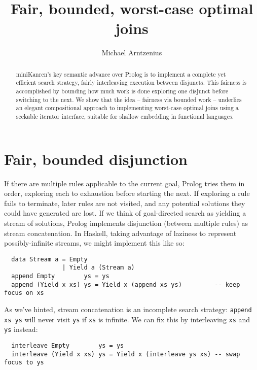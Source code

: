 \documentclass[acmsmall,screen,review,anonymous,dvipsnames]{acmart}
\title{Fair, bounded, worst-case optimal joins}
\author{Michael Arntzenius}
\affiliation{%
	\institution{UC Berkeley}
	\city{Berkeley}
	\state{CA}
	\country{USA}
}
\begin{document}
\begin{abstract}
  {miniKanren}'s key semantic advance over Prolog is to implement a complete yet efficient search strategy, fairly interleaving execution between disjuncts.
  This fairness is accomplished by bounding how much work is done exploring one disjunct before switching to the next.
  We show that the idea -- fairness via bounded work -- underlies an elegant compositional approach to implementing worst-case optimal joins using a seekable iterator interface, suitable for shallow embedding in functional languages.
\end{abstract}

\maketitle

\section{Fair, bounded disjunction}

If there are multiple rules applicable to the current goal, Prolog tries them in order, exploring each to exhaustion before starting the next.
If exploring a rule fails to terminate, later rules are not visited, and any potential solutions they could have generated are lost.
If we think of goal-directed search as yielding a stream of solutions, Prolog implements disjunction (between multiple rules) as stream concatenation.
In Haskell, taking advantage of laziness to represent possibly-infinite streams, we might implement this like so:

\begin{verbatim}
  data Stream a = Empty
                | Yield a (Stream a)
  append Empty        ys = ys
  append (Yield x xs) ys = Yield x (append xs ys)         -- keep focus on xs
\end{verbatim}

\noindent
As we've hinted, stream concatenation is an incomplete search strategy: \texttt{append xs ys} will never visit \texttt{ys} if \texttt{xs} is infinite.
We can fix this by interleaving \texttt{xs} and \texttt{ys} instead:

\begin{verbatim}
  interleave Empty        ys = ys
  interleave (Yield x xs) ys = Yield x (interleave ys xs) -- swap focus to ys
\end{verbatim}
\end{document}
